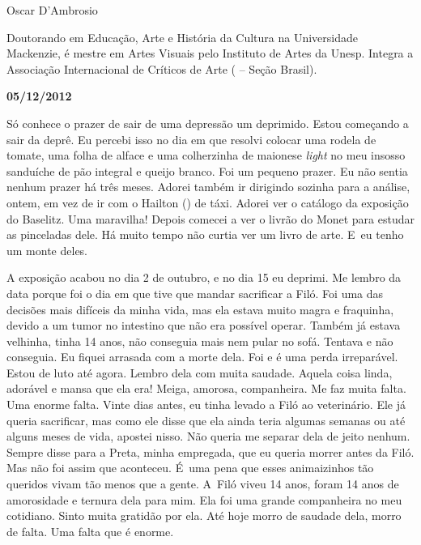 \medskip{} 
\begin{flushright}Oscar D'Ambrosio\end{flushright}

\begin{flushright}Doutorando em Educação, Arte e História da Cultura na Universidade
Mackenzie, é mestre em Artes Visuais pelo Instituto de Artes da Unesp.
Integra a Associação Internacional de Críticos de Arte ( -- Seção
Brasil).\end{flushright}

\begin{center}\asterisc{}\end{center}


\begin{flushright}\textbf{05/12/2012}\end{flushright}


Só conhece o prazer de sair de uma depressão um deprimido. Estou
começando a sair da deprê. Eu percebi isso no dia em que resolvi colocar
uma rodela de tomate, uma folha de alface e uma colherzinha de maionese
\emph{light} no meu insosso sanduíche de pão integral e queijo branco.
Foi um pequeno prazer. Eu não sentia nenhum prazer há três meses. Adorei
também ir dirigindo sozinha para a análise, ontem, em vez de ir com o
Hailton () de táxi. Adorei ver o catálogo da exposição do Baselitz.
Uma maravilha! Depois comecei a ver o livrão do Monet para estudar as
pinceladas dele. Há muito tempo não curtia ver um livro de arte. E~eu
tenho um monte deles.

A exposição acabou no dia 2 de outubro, e no dia 15 eu deprimi. Me
lembro da data porque foi o dia em que tive que mandar sacrificar a
Filó. Foi uma das decisões mais difíceis da minha vida, mas ela estava
muito magra e fraquinha, devido a um tumor no intestino que não era
possível operar. Também já estava velhinha, tinha 14 anos, não conseguia
mais nem pular no sofá. Tentava e não conseguia. Eu fiquei arrasada com
a morte dela. Foi e é uma perda irreparável. Estou de luto até agora.
Lembro dela com muita saudade. Aquela coisa linda, adorável e mansa que
ela era! Meiga, amorosa, companheira. Me faz muita falta. Uma enorme
falta. Vinte dias antes, eu tinha levado a Filó ao veterinário. Ele já
queria sacrificar, mas como ele disse que ela ainda teria algumas
semanas ou até alguns meses de vida, apostei nisso. Não queria me
separar dela de jeito nenhum. Sempre disse para a Preta, minha
empregada, que eu queria morrer antes da Filó. Mas não foi assim que
aconteceu. É~uma pena que esses animaizinhos tão queridos vivam tão
menos que a gente. A~Filó viveu 14 anos, foram 14 anos de amorosidade e
ternura dela para mim. Ela foi uma grande companheira no meu cotidiano.
Sinto muita gratidão por ela. Até hoje morro de saudade dela, morro de
falta. Uma falta que é enorme.

